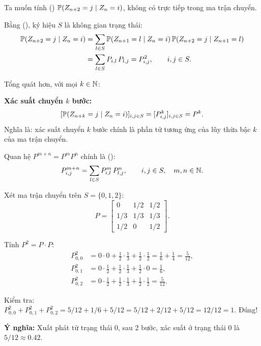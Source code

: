 Ta muốn tính  ()
$\mathbb{P}(Z_{n+2} = j \mid Z_n = i)$, không có trực tiếp trong ma trận chuyển.

Bằng  (), ký hiệu $S$ là không gian trạng thái:
\begin{align*}
  \mathbb{P}(Z_{n+2} = j \mid Z_n = i)
  &= \sum_{l \in S} \mathbb{P}(Z_{n+1} = l \mid Z_n = i)\,\mathbb{P}(Z_{n+2} = j \mid Z_{n+1} = l)\\
  &= \sum_{l \in S} P_{i,l}\,P_{l,j}
  = P^2_{i,j}, \qquad i, j \in S.
\end{align*}

Tổng quát hơn, với mọi $k \in \mathbb{N}$:

\begin{congthuc}
\textbf{Xác suất chuyển $k$ bước:}
\[
  [\mathbb{P}(Z_{n+k} = j \mid Z_n = i)]_{i,j\in S} = [P^k_{i,j}]_{i,j\in S} = P^k.
\]
Nghĩa là: xác suất chuyển $k$ bước chính là phần tử tương ứng của lũy thừa bậc $k$ của ma trận chuyển.
\end{congthuc}

Quan hệ $P^{m+n} = P^m P^n$ chính là  ():
\[
  P^{m+n}_{i,j} = \sum_{l \in S} P^m_{i,l}\,P^n_{l,j}, \qquad i,j \in S, \quad m, n \in \mathbb{N}.
\]

\begin{example}
\label{ex:P2-three-state}
Xét ma trận chuyển trên $S = \{0, 1, 2\}$:
\[
  P = \begin{bmatrix}
    0 & 1/2 & 1/2 \\
    1/3 & 1/3 & 1/3 \\
    1/2 & 0 & 1/2
  \end{bmatrix}.
\]

Tính $P^2 = P \cdot P$:
\begin{align*}
  P^2_{0,0} &= 0 \cdot 0 + \frac{1}{2} \cdot \frac{1}{3} + \frac{1}{2} \cdot \frac{1}{2} = \frac{1}{6} + \frac{1}{4} = \frac{5}{12}, \\
  P^2_{0,1} &= 0 \cdot \frac{1}{2} + \frac{1}{2} \cdot \frac{1}{3} + \frac{1}{2} \cdot 0 = \frac{1}{6}, \\
  P^2_{0,2} &= 0 \cdot \frac{1}{2} + \frac{1}{2} \cdot \frac{1}{3} + \frac{1}{2} \cdot \frac{1}{2} = \frac{5}{12}.
\end{align*}

Kiểm tra: $P^2_{0,0} + P^2_{0,1} + P^2_{0,2} = 5/12 + 1/6 + 5/12 = 5/12 + 2/12 + 5/12 = 12/12 = 1$. Đúng!

\textbf{Ý nghĩa:} Xuất phát từ trạng thái 0, sau 2 bước, xác suất ở trạng thái 0 là $5/12 \approx 0.42$.
\end{example}


